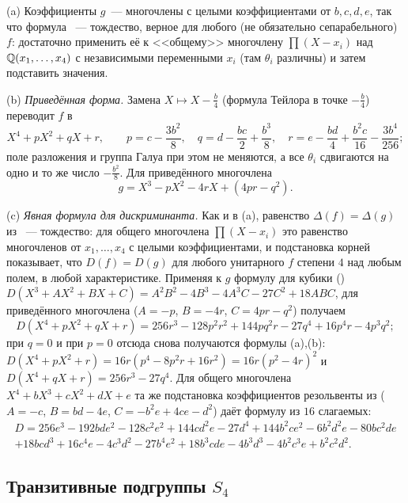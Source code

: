 \begin{remark}[4.9a]
(a) Коэффициенты $g$~--- многочлены с целыми коэффициентами от $b,c,d,e$, так что формула ~--- тождество, верное для
любого (не обязательно сепарабельного) $f$: достаточно применить её к <<общему>> многочлену $\prod(X-x_i)$ над
$\mathbb Q(x_1,\dots,x_4)$ с независимыми переменными $x_i$ (там $\theta_i$ различны) и затем подставить значения.

(b) \emph{Приведённая форма.} Замена $X\mapsto X-\frac b4$ (формула Тейлора в точке $-\frac b4$) переводит $f$ в
\[
X^4+pX^2+qX+r,\qquad p=c-\frac{3b^2}8,\quad q=d-\frac{bc}2+\frac{b^3}8,\quad r=e-\frac{bd}4+\frac{b^2c}{16}-\frac{3b^4}{256};
\]
поле разложения и группа Галуа при этом не меняются, а все $\theta_i$ сдвигаются на одно и то же число $-\frac{b^2}8$. Для
приведённого многочлена
\[
g=X^3-pX^2-4rX+(4pr-q^2).
\]

(c) \emph{Явная формула для дискриминанта.} Как и в (a), равенство $\Delta(f)=\Delta(g)$ из ~--- тождество: для общего
многочлена $\prod(X-x_i)$ это равенство многочленов от $x_1,\dots,x_4$ с целыми коэффициентами, и подстановка корней
показывает, что $D(f)=D(g)$ для любого унитарного $f$ степени $4$ над любым полем, в любой характеристике.
Применяя к $g$ формулу для кубики ()
$D(X^3+AX^2+BX+C)=A^2B^2-4B^3-4A^3C-27C^2+18ABC$, для приведённого многочлена ($A=-p$, $B=-4r$, $C=4pr-q^2$) получаем
\[
D(X^4+pX^2+qX+r)=256r^3-128p^2r^2+144pq^2r-27q^4+16p^4r-4p^3q^2 ;
\]
при $q=0$ и при $p=0$ отсюда снова получаются формулы (a),(b): $D(X^4+pX^2+r)=16r(p^4-8p^2r+16r^2)=16r(p^2-4r)^2$ и
$D(X^4+qX+r)=256r^3-27q^4$. Для общего многочлена $X^4+bX^3+cX^2+dX+e$ та же подстановка коэффициентов резольвенты из 
($A=-c$, $B=bd-4e$, $C=-b^2e+4ce-d^2$) даёт формулу из $16$ слагаемых:
\begin{multline*}
D=256e^3-192bde^2-128c^2e^2+144cd^2e-27d^4+144b^2ce^2-6b^2d^2e-80bc^2de\\
+18bcd^3+16c^4e-4c^3d^2-27b^4e^2+18b^3cde-4b^3d^3-4b^2c^3e+b^2c^2d^2 .
\end{multline*}
\end{remark}

\subsection*{Транзитивные подгруппы $S_4$}

